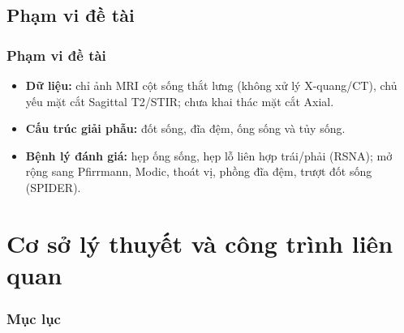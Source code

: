 \documentclass{beamer}
\numberwithin{figure}{section}
\numberwithin{table}{section}
\begin{document}
\subsection{Phạm vi đề tài}
\begin{frame}
\frametitle{Phạm vi đề tài}
\begin{itemize}
    \item[--] \textbf{Dữ liệu:} chỉ ảnh MRI cột sống thắt lưng (không xử lý X-quang/CT), chủ yếu mặt cắt Sagittal T2/STIR; chưa khai thác mặt cắt Axial.
    \item[--] \textbf{Cấu trúc giải phẫu:} đốt sống, đĩa đệm, ống sống và tủy sống.
    \item[--] \textbf{Bệnh lý đánh giá:} hẹp ống sống, hẹp lỗ liên hợp trái/phải (RSNA); mở rộng sang Pfirrmann, Modic, thoát vị, phồng đĩa đệm, trượt đốt sống (SPIDER).
\end{itemize}
\end{frame}

\section{Cơ sở lý thuyết và công trình liên quan}
{
    \begin{frame}[t]
        \frametitle{Mục lục}
    \end{frame}
}
\end{document}
